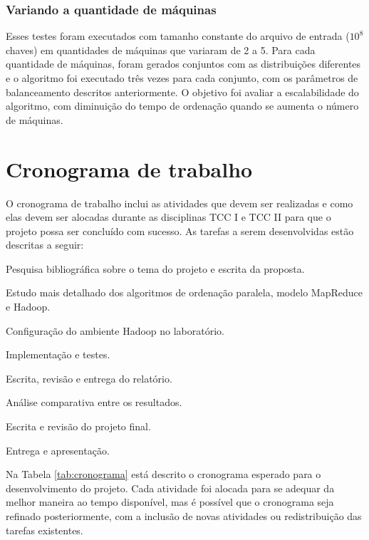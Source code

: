 \subsubsection{Variando a quantidade de máquinas}

Esses testes foram executados com tamanho constante do arquivo de entrada  ($10^{8}$ chaves) em quantidades de máquinas que variaram de 2 a 5. 
Para cada quantidade de máquinas, foram gerados conjuntos com as distribuições diferentes e o algoritmo foi executado três vezes para cada conjunto, com os parâmetros de balanceamento descritos anteriormente. O objetivo foi avaliar a escalabilidade do algoritmo, com diminuição do tempo de ordenação quando se aumenta o número de máquinas.

\section{Cronograma de trabalho}


O cronograma de trabalho inclui as atividades que devem ser realizadas e como elas devem ser alocadas durante as disciplinas TCC I e TCC II para que o projeto possa ser concluído com sucesso.
As tarefas a serem desenvolvidas estão descritas a seguir:

\begin{num_enum}
 \item \label{c1} Pesquisa bibliográfica sobre o tema do projeto e escrita da proposta.
 \item \label{c2} Estudo mais detalhado dos algoritmos de ordenação paralela,  modelo MapReduce e Hadoop.
 \item \label{c3} Configuração do ambiente Hadoop no laboratório.
 \item \label{c4} Implementação e testes.
 \item \label{c5} Escrita, revisão e entrega do relatório. 
 \item \label{c7} Análise comparativa entre os resultados.
 \item \label{c8} Escrita e revisão do projeto final.
 \item \label{c9} Entrega e apresentação.
 \end{num_enum}
 
 
Na Tabela \ref{tab:cronograma} está descrito o cronograma esperado para o desenvolvimento do projeto. Cada atividade foi alocada para se adequar da melhor maneira ao tempo disponível, mas é possível que o cronograma seja refinado posteriormente, com a inclusão de novas atividades ou redistribuição das tarefas existentes. 

